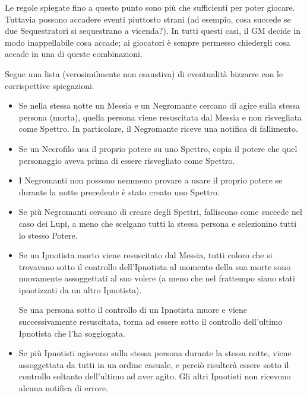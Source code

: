 \documentclass[a4paper,10pt]{article}
\begin{document}
Le regole spiegate fino a questo punto sono più che sufficienti per poter giocare. Tuttavia possono accadere eventi piuttosto strani (ad esempio, cosa succede se due Sequestratori si sequestrano a vicenda?). In tutti questi casi, il GM decide in modo inappellabile cosa accade; ai giocatori è sempre permesso chiedergli cosa accade in una di queste combinazioni.

Segue una lista (verosimilmente non esaustiva) di eventualità bizzarre con le corrispettive spiegazioni.

\begin{itemize}
 \item Se nella stessa notte un Messia e un Negromante cercano di agire sulla stessa persona (morta), quella persona viene resuscitata dal Messia e non risvegliata come Spettro. In particolare, il Negromante riceve una notifica di fallimento.
 
 
 \item Se un Necrofilo usa il proprio potere su uno Spettro, copia il potere che quel personaggio aveva prima di essere risvegliato come Spettro.
 
 \item I Negromanti non possono nemmeno provare a usare il proprio potere se durante la notte precedente è stato creato uno Spettro.
 
 \item Se più Negromanti cercano di creare degli Spettri, falliscono come succede nel caso dei Lupi, a meno che scelgano tutti la stessa persona e selezionino tutti lo stesso Potere.

 \item Se un Ipnotista morto viene resuscitato dal Messia, tutti coloro che si trovavano sotto il controllo dell'Ipnotista al momento della sua morte sono nuovamente assoggettati al suo volere (a meno che nel frattempo siano stati ipnotizzati da un altro Ipnotista).
 
 Se una persona sotto il controllo di un Ipnotista muore e viene successivamente resuscitata, torna ad essere sotto il controllo dell'ultimo Ipnotista che l'ha soggiogata.
 
 \item Se più Ipnotisti agiscono sulla stessa persona durante la stessa notte, viene assoggettata da tutti in un ordine casuale, e perciò risulterà essere sotto il controllo soltanto dell'ultimo ad aver agito. Gli altri Ipnotisti non ricevono alcuna notifica di errore.
 

\end{itemize}
\end{document}
